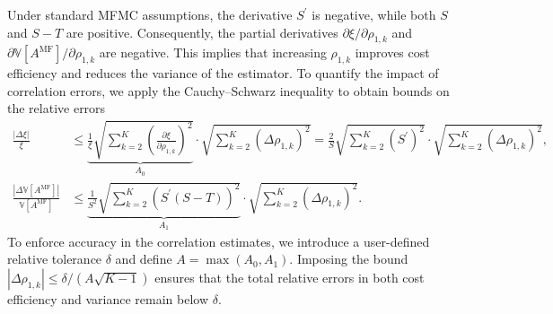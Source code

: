 %
Under standard MFMC assumptions, the derivative $S^\prime$ is negative, while both $S$ and $S - T$ are positive. Consequently, the partial derivatives $\partial \xi / \partial \rho_{1,k}$ and $\partial \mathbb{V}[A^{\text{MF}}] / \partial \rho_{1,k}$ are negative. This implies that increasing $\rho_{1,k}$ improves cost efficiency and reduces the variance of the estimator. To quantify the impact of correlation errors, we apply the Cauchy–Schwarz inequality to obtain bounds on the relative errors
%
\begin{align}
\label{eq:delta_xi_bound}
    \frac{\left|\Delta \xi\right|}{\xi}&\le \underbrace{\frac{1}{\xi}\sqrt{\sum_{k=2}^K \left(\frac{\partial \xi}{\partial \rho_{1,k}}\right)^2}}_{A_0} \cdot \sqrt{\sum_{k=2}^K\left(\Delta\rho_{1,k}\right)^2}=\frac{2}{S}\sqrt{\sum_{k=2}^K(S^\prime)^2} \cdot \sqrt{\sum_{k=2}^K\left(\Delta\rho_{1,k}\right)^2},\\
    \label{eq:delta_var_bound}
    \frac{\left|\Delta \mathbb{V}\left[A^{\text{MF}}\right]\right|}{\mathbb{V}\left[A^{\text{MF}}\right]}&\le
    \underbrace{\frac{1}{S^2}\sqrt{\sum_{k=2}^K\left(S^\prime \left(S-T\right)\right)^2}}_{A_1}\cdot \sqrt{\sum_{k=2}^K\left(\Delta\rho_{1,k}\right)^2}.
\end{align}
%
To enforce accuracy in the correlation estimates, we introduce a user-defined relative tolerance $\delta$ and define $A = \max(A_0, A_1)$. Imposing the bound $|\Delta \rho_{1,k}| \le \delta / (A \sqrt{K - 1})$ ensures that the total relative errors in both cost efficiency and variance remain below $\delta$.








